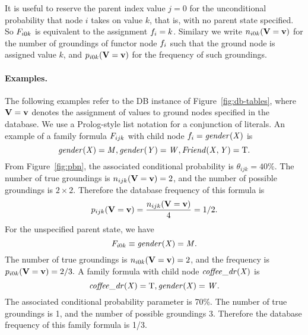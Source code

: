 \documentclass[twoside,leqno,twocolumn]{article}
\begin{document}
It is useful to reserve the parent index value $j=0$ for the unconditional probability that node $i$ takes on value $k$, that is, with no parent state specified. So $F_{i0k}$ is equivalent to the assignment $f_{i} = k$. Similary we write  $n_{i0k}(\mathbf{V} = \mathbf{v})$ for the number of groundings of functor node $f_{i}$ such that the ground node is assigned value $k$, and $p_{i0k}(\mathbf{V} = \mathbf{v})$ for the frequency of such groundings. 



\paragraph{Examples.} The following examples refer to the DB instance of Figure~\ref{fig:db-tables}, where $\mathbf{V} = \mathbf{v}$ denotes the assignment of values to ground nodes specified in the database.
We use a Prolog-style list notation for a conjunction of literals. 
An example of a family formula $F_{ijk}$  with child node $f_{i}=\it{gender}(X)$ is 
\[ \it{gender}(X)= M,\it{gender}(Y) = W,\it{Friend}(X,Y) = \mathrm{T}.\] 
From Figure~\ref{fig:pbn}, the associated conditional probability is $\theta_{ijk}= 40\%$.
The number of true groundings is $n_{ijk}(\mathbf{V} = \mathbf{v}) = 2$, and the number of possible groundings is  $2 \times 2$. Therefore the database frequency of this formula is \[p_{ijk}(\mathbf{V} = \mathbf{v}) = \frac{n_{ijk}(\mathbf{V} = \mathbf{v})}{4}= 1/2.\] For the unspecified parent state, we have \[F_{i0k} \equiv \it{gender}(X) = M.\] The number of true groundings is $n_{i0k}(\mathbf{V} = \mathbf{v}) = 2$, and the frequency is $p_{i0k}(\mathbf{V} = \mathbf{v}) = 2/3.$
%
A family formula with child node $\it{coffee\_{dr}}(X)$ is \[\it{coffee\_{dr}}(X) = \mathrm{T}, \it{gender}(X) = W.\] The associated conditional probability parameter is 70\%.
The number of true groundings is 1, and the number of possible groundings 3. 
Therefore the database frequency of this family formula is 1/3.
\end{document}
